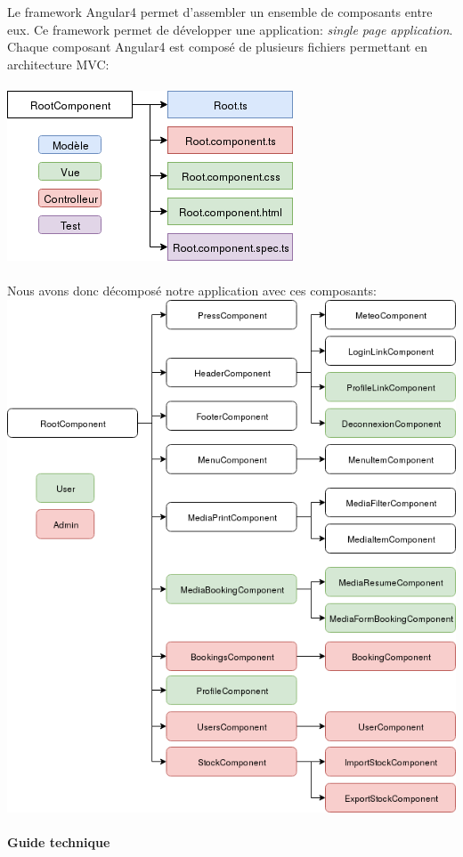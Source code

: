 \documentclass{article}
\begin{document}
  Le framework Angular4 permet d'assembler un ensemble de composants entre eux. Ce
  framework permet de développer une application: \emph{single page application}.
  Chaque composant Angular4 est composé de plusieurs fichiers permettant en architecture MVC:\\ \\
  \includegraphics[scale=0.6]{archi_component.png}\\ \\
  Nous avons donc décomposé notre application avec ces composants:\\
  \includegraphics[scale=0.5]{allcomponent.png}
  
  \paragraph{Guide technique} \
  
\end{document}
